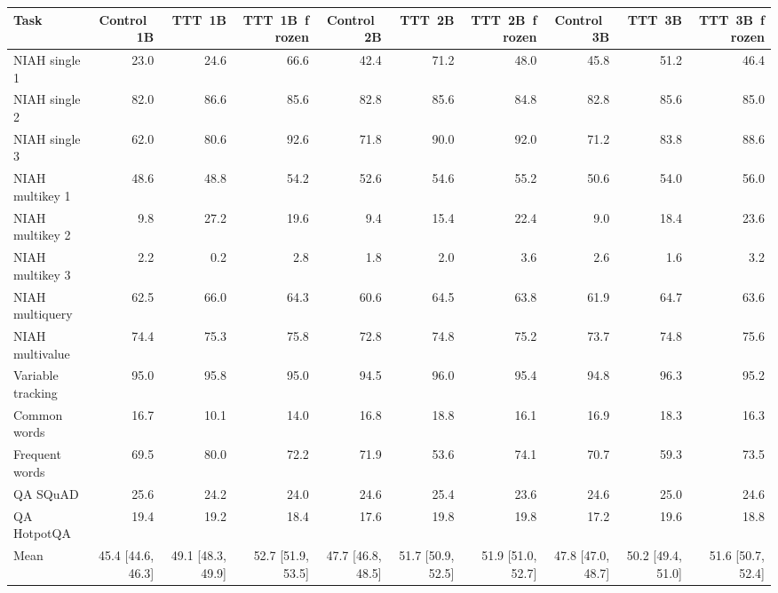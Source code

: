 \begin{tabular}{lrrrrrrrrr}
\toprule
Task & Control~1B & TTT~1B & TTT~1B~frozen & Control~2B & TTT~2B & TTT~2B~frozen & Control~3B & TTT~3B & TTT~3B~frozen \\
\midrule
NIAH single 1 & 23.0 & 24.6 & 66.6 & 42.4 & 71.2 & 48.0 & 45.8 & 51.2 & 46.4 \\
NIAH single 2 & 82.0 & 86.6 & 85.6 & 82.8 & 85.6 & 84.8 & 82.8 & 85.6 & 85.0 \\
NIAH single 3 & 62.0 & 80.6 & 92.6 & 71.8 & 90.0 & 92.0 & 71.2 & 83.8 & 88.6 \\
NIAH multikey 1 & 48.6 & 48.8 & 54.2 & 52.6 & 54.6 & 55.2 & 50.6 & 54.0 & 56.0 \\
NIAH multikey 2 & 9.8 & 27.2 & 19.6 & 9.4 & 15.4 & 22.4 & 9.0 & 18.4 & 23.6 \\
NIAH multikey 3 & 2.2 & 0.2 & 2.8 & 1.8 & 2.0 & 3.6 & 2.6 & 1.6 & 3.2 \\
NIAH multiquery & 62.5 & 66.0 & 64.3 & 60.6 & 64.5 & 63.8 & 61.9 & 64.7 & 63.6 \\
NIAH multivalue & 74.4 & 75.3 & 75.8 & 72.8 & 74.8 & 75.2 & 73.7 & 74.8 & 75.6 \\
Variable tracking & 95.0 & 95.8 & 95.0 & 94.5 & 96.0 & 95.4 & 94.8 & 96.3 & 95.2 \\
Common words & 16.7 & 10.1 & 14.0 & 16.8 & 18.8 & 16.1 & 16.9 & 18.3 & 16.3 \\
Frequent words & 69.5 & 80.0 & 72.2 & 71.9 & 53.6 & 74.1 & 70.7 & 59.3 & 73.5 \\
QA SQuAD & 25.6 & 24.2 & 24.0 & 24.6 & 25.4 & 23.6 & 24.6 & 25.0 & 24.6 \\
QA HotpotQA & 19.4 & 19.2 & 18.4 & 17.6 & 19.8 & 19.8 & 17.2 & 19.6 & 18.8 \\
\midrule
Mean & 45.4 [44.6, 46.3] & 49.1 [48.3, 49.9] & 52.7 [51.9, 53.5] & 47.7 [46.8, 48.5] & 51.7 [50.9, 52.5] & 51.9 [51.0, 52.7] & 47.8 [47.0, 48.7] & 50.2 [49.4, 51.0] & 51.6 [50.7, 52.4] \\
\bottomrule
\end{tabular}
